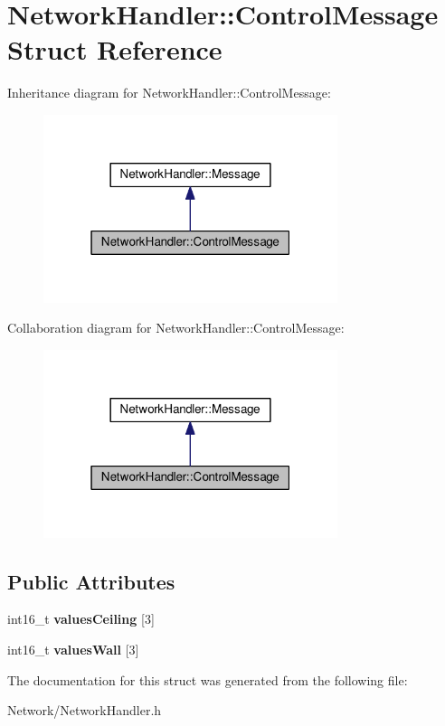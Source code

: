 \hypertarget{structNetworkHandler_1_1ControlMessage}{}\section{Network\+Handler\+:\+:Control\+Message Struct Reference}
\label{structNetworkHandler_1_1ControlMessage}


Inheritance diagram for Network\+Handler\+:\+:Control\+Message\+:\nopagebreak
\begin{figure}[H]
\begin{center}
\leavevmode
\includegraphics[width=244pt]{structNetworkHandler_1_1ControlMessage__inherit__graph}
\end{center}
\end{figure}


Collaboration diagram for Network\+Handler\+:\+:Control\+Message\+:\nopagebreak
\begin{figure}[H]
\begin{center}
\leavevmode
\includegraphics[width=244pt]{structNetworkHandler_1_1ControlMessage__coll__graph}
\end{center}
\end{figure}
\subsection*{Public Attributes}
\begin{DoxyCompactItemize}
\item 
int16\+\_\+t {\bfseries values\+Ceiling} \mbox{[}3\mbox{]}\hypertarget{structNetworkHandler_1_1ControlMessage_ac24f313f593e8fe3406f9ae54201513a}{}\label{structNetworkHandler_1_1ControlMessage_ac24f313f593e8fe3406f9ae54201513a}

\item 
int16\+\_\+t {\bfseries values\+Wall} \mbox{[}3\mbox{]}\hypertarget{structNetworkHandler_1_1ControlMessage_a6d54372eb881b32e6face646afaaea86}{}\label{structNetworkHandler_1_1ControlMessage_a6d54372eb881b32e6face646afaaea86}

\end{DoxyCompactItemize}


The documentation for this struct was generated from the following file\+:\begin{DoxyCompactItemize}
\item 
Network/Network\+Handler.\+h\end{DoxyCompactItemize}

